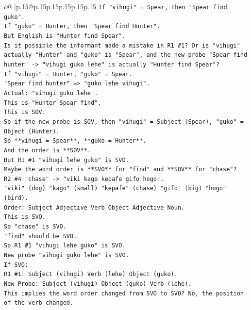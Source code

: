 \documentclass{article}
\begin{document}
{\begin{supertabular}{c@{$\;$}|p{.15\linewidth}@{}p{.15\linewidth}p{.15\linewidth}p{.15\linewidth}p{.15\linewidth}p{.15\linewidth}}
{{{\texttt{If "vihugi" = Spear, then "Spear find guko".} \\
\texttt{If "guko" = Hunter, then "Spear find Hunter".} \\
\texttt{But English is "Hunter find Spear".} \\
\texttt{Is it possible the informant made a mistake in R1 \#1? Or is "vihugi" actually "Hunter" and "guko" is "Spear", and the new probe "Spear find hunter" {-}> "vihugi guko lehe" is actually "Hunter find Spear"?} \\
\texttt{If "vihugi" = Hunter, "guko" = Spear.} \\
\texttt{"Spear find hunter" => "guko lehe vihugi".} \\
\texttt{Actual: "vihugi guko lehe".} \\
\texttt{This is "Hunter Spear find".} \\
\texttt{This is SOV.} \\
\texttt{So if the new probe is SOV, then "vihugi" = Subject (Spear), "guko" = Object (Hunter).} \\
\texttt{So **vihugi = Spear**, **guko = Hunter**.} \\
\texttt{And the order is **SOV**.} \\
\texttt{But R1 \#1 "vihugi lehe guko" is SVO.} \\
\texttt{Maybe the word order is **SVO** for "find" and **SOV** for "chase"?} \\
\texttt{R2 \#4 "chase" {-}> "viki kago kepafe gifo hogo".} \\
\texttt{"viki" (dog) "kago" (small) "kepafe" (chase) "gifo" (big) "hogo" (bird).} \\
\texttt{Order: Subject Adjective Verb Object Adjective Noun.} \\
\texttt{This is SVO.} \\
\texttt{So "chase" is SVO.} \\
\texttt{"find" should be SVO.} \\
\texttt{So R1 \#1 "vihugi lehe guko" is SVO.} \\
\texttt{New probe "vihugi guko lehe" is SVO.} \\
\texttt{If SVO:} \\
\texttt{R1 \#1: Subject (vihugi) Verb (lehe) Object (guko).} \\
\texttt{New Probe: Subject (vihugi) Object (guko) Verb (lehe).} \\
\texttt{This implies the word order changed from SVO to SVO? No, the position of the verb changed.} \\
}}}
\end{supertabular}}
\end{document}
